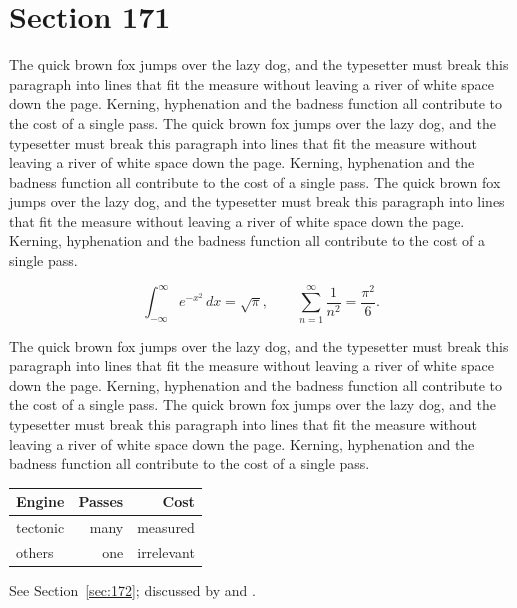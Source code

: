 \documentclass{article}
\begin{document}
\section{Section 171}
\label{sec:171}
The quick brown fox jumps over the lazy dog, and the typesetter must break this paragraph into lines that fit the measure without leaving a river of white space down the page. Kerning, hyphenation and the badness function all contribute to the cost of a single pass. The quick brown fox jumps over the lazy dog, and the typesetter must break this paragraph into lines that fit the measure without leaving a river of white space down the page. Kerning, hyphenation and the badness function all contribute to the cost of a single pass. The quick brown fox jumps over the lazy dog, and the typesetter must break this paragraph into lines that fit the measure without leaving a river of white space down the page. Kerning, hyphenation and the badness function all contribute to the cost of a single pass. 

\begin{equation}\label{eq:171}
\int_{-\infty}^{\infty} e^{-x^{2}}\,dx = \sqrt{\pi}, \qquad
\sum_{n=1}^{\infty} \frac{1}{n^{2}} = \frac{\pi^{2}}{6}.
\end{equation}

The quick brown fox jumps over the lazy dog, and the typesetter must break this paragraph into lines that fit the measure without leaving a river of white space down the page. Kerning, hyphenation and the badness function all contribute to the cost of a single pass. The quick brown fox jumps over the lazy dog, and the typesetter must break this paragraph into lines that fit the measure without leaving a river of white space down the page. Kerning, hyphenation and the badness function all contribute to the cost of a single pass. 

\begin{center}
\begin{tabular}{lrr}
\toprule
Engine & Passes & Cost \\
\midrule
tectonic & many & measured \\
others & one & irrelevant \\
\bottomrule
\end{tabular}
\end{center}

See Section~\ref{sec:172}; discussed by \textcite{k2} and \textcite{l4}.
\end{document}

